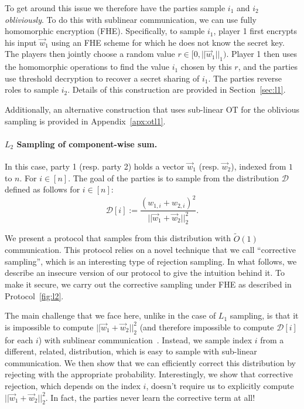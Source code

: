To get around this issue we therefore have the parties sample $i_1$ and
$i_2$ {\em obliviously}. To do this with sublinear communication, we can
use fully homomorphic encryption (FHE).  Specifically, to sample $i_1$,
player 1 first encrypts his input $\vec{w}_1$ using an FHE scheme for
which he does not know the secret key.  The players then jointly choose
a random value $r \in [0,||\vec{w}_1||_1)$.  Player 1 then uses the
homomorphic operations to find the value $i_1$ chosen by this $r$, and
the parties use threshold decryption to recover a secret sharing of
$i_1$.  The parties reverse roles to sample $i_2$.  Details of this
construction are provided in Section~\ref{sec:l1}.  

Additionally, an alternative construction that uses sub-linear OT for
the oblivious sampling is provided in Appendix~\ref{apx:otl1}.

\paragraph{$L_2$ Sampling of component-wise sum.}
In this case, party 1 (resp. party 2) holds a  vector
$\vec{w}_1$ (resp. $\vec{w}_2$), indexed from $1$ to $n$. For $i \in
[n]$.
%
The goal of the parties is to sample from the distribution
$\mathcal{D}$ 
defined as follows for $i \in [n]$:
\[
\mathcal{D}[i] := \frac{(w_{1,i} + w_{2,i})^2}{||\vec{w}_1 + \vec{w}_2||_2^2}.
\]

We present a protocol that samples from this distribution with
$\tilde{O}(1)$ communication.
%
This protocol relies on a novel technique that we call ``corrective
sampling'', which is an interesting type of rejection sampling.  In what follows, we describe an insecure version of our protocol to give the intuition behind it.  To make it secure, we carry out the corrective sampling under FHE as described in Protocol~\ref{fig:l2}. 

The main challenge that we face here, unlike in the case of $L_1$ sampling, is that it is impossible to  compute 
$||\vec{w}_1 + \vec{w}_2||_2^2$ (and therefore impossible to  compute $\mathcal{D}[i]$ for each $i$)
with sublinear
communication~\cite{STOC:BabNisSze89}. 
Instead, we sample index $i$ from a different, related, distribution, which is easy to sample with sub-linear communication.  We then show that we
can efficiently correct this distribution by rejecting with the appropriate probability.  Interestingly, we show that corrective rejection, 
which depends on the index $i$, 
doesn't require us to explicitly compute $||\vec{w}_1 + \vec{w}_2||_2^2$.  In fact, 
the parties never learn the corrective term at all!  

